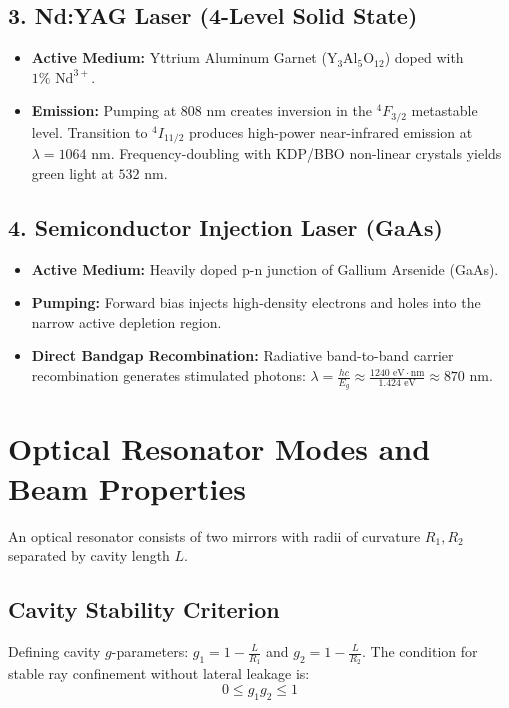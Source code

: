 \subsection{3. Nd:YAG Laser (4-Level Solid State)}
\begin{itemize}[itemsep=2pt]
    \item \textbf{Active Medium:} Yttrium Aluminum Garnet ($\text{Y}_3\text{Al}_5\text{O}_{12}$) doped with $1\%\text{ Nd}^{3+}$.
    \item \textbf{Emission:} Pumping at $808\text{ nm}$ creates inversion in the $^4F_{3/2}$ metastable level. Transition to $^4I_{11/2}$ produces high-power near-infrared emission at $\lambda = 1064\text{ nm}$. Frequency-doubling with KDP/BBO non-linear crystals yields green light at $532\text{ nm}$.
\end{itemize}

\subsection{4. Semiconductor Injection Laser (GaAs)}
\begin{itemize}[itemsep=2pt]
    \item \textbf{Active Medium:} Heavily doped p-n junction of Gallium Arsenide (GaAs).
    \item \textbf{Pumping:} Forward bias injects high-density electrons and holes into the narrow active depletion region.
    \item \textbf{Direct Bandgap Recombination:} Radiative band-to-band carrier recombination generates stimulated photons: $\lambda = \frac{hc}{E_g} \approx \frac{1240\text{ eV}\cdot\text{nm}}{1.424\text{ eV}} \approx 870\text{ nm}$.
\end{itemize}


\section{Optical Resonator Modes and Beam Properties}
An optical resonator consists of two mirrors with radii of curvature $R_1, R_2$ separated by cavity length $L$.
\subsection{Cavity Stability Criterion}
Defining cavity $g$-parameters: $g_1 = 1 - \frac{L}{R_1}$ and $g_2 = 1 - \frac{L}{R_2}$. The condition for stable ray confinement without lateral leakage is:
\begin{equation}
0 \le g_1 g_2 \le 1
\end{equation}

